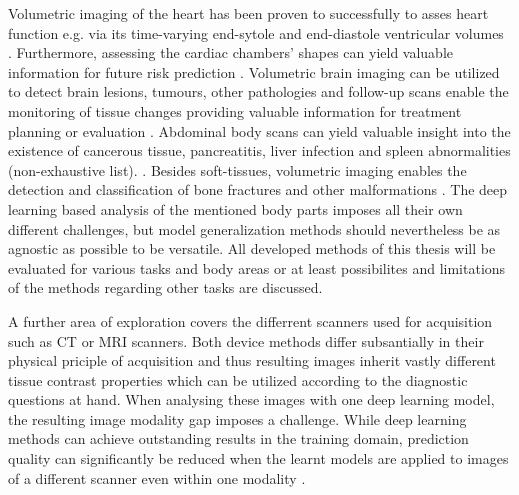             Volumetric imaging of the heart has been proven to successfully to asses heart function e.g. via its time-varying end-sytole and end-diastole ventricular volumes
            \citep{pattynama1994evaluation, bernard2018deep}. %
            Furthermore, assessing the cardiac chambers' shapes can yield valuable information for future risk prediction
            \citep{ly2022interpretable}. %
            Volumetric brain imaging can be utilized to detect brain lesions, tumours, other pathologies
            \citep{
                hering2024improving, %
                uzunova2019unsupervised, %
            }
            and follow-up scans enable the monitoring of tissue changes providing valuable information for treatment planning or evaluation
            \citep{baheti2021brain}. %
            Abdominal body scans can yield valuable insight into the existence of cancerous tissue, pancreatitis, liver infection and spleen abnormalities (non-exhaustive list).
            \citep{caraiani2020indications}.
            Besides soft-tissues, volumetric imaging enables the detection and classification of bone fractures and other malformations \citep{kuo2022artificial}.
            The deep learning based analysis of the mentioned body parts imposes all their own different challenges, but model generalization methods should nevertheless be as agnostic as possible to be versatile. All developed methods of this thesis will be evaluated for various tasks and body areas or at least possibilites and limitations of the methods regarding other tasks are discussed.

            A further area of exploration covers the differrent scanners used for acquisition such as CT or MRI scanners. Both device methods differ subsantially in their physical priciple of acquisition and thus resulting images inherit vastly different tissue contrast properties which can be utilized according to the diagnostic questions at hand.
            When analysing these images with one deep learning model, the resulting image modality gap imposes a challenge. While deep learning methods can achieve outstanding results in the training domain, prediction quality can significantly be reduced when the learnt models are applied to images of a different scanner even within one modality \citep{pooch2020can}.

